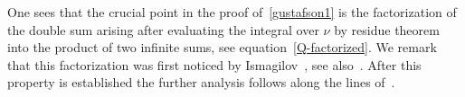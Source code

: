 One sees that the crucial point in the proof of~\eqref{gustafson1} is the factorization of the double sum arising after evaluating the integral over $\nu$ by residue theorem into the product of two infinite sums, see equation~\eqref{Q-factorized}. We remark that this factorization was first noticed by Ismagi\-lov~\mbox{\cite{MR2265687,MR2354280}}, see also~\cite{Neretin:2019xze}. After this property is established the further analysis follows along the lines of~\cite{Gustafson94}.
